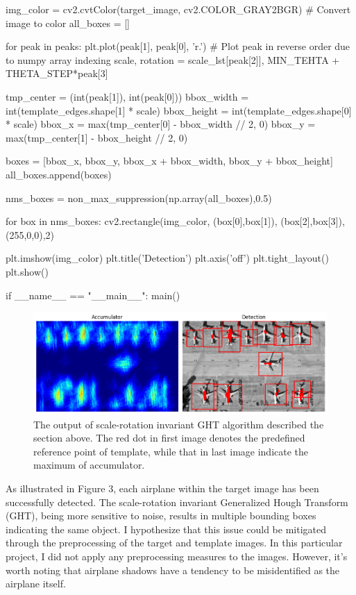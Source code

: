 \documentclass[10pt]{article}
\begin{document}
\begin{python}
    img_color = cv2.cvtColor(target_image, cv2.COLOR_GRAY2BGR)  # Convert image to color
    all_boxes = []

    for peak in peaks:
        plt.plot(peak[1], peak[0], 'r.')  # Plot peak in reverse order due to numpy array indexing
        scale, rotation = scale_lst[peak[2]], MIN_TEHTA + THETA_STEP*peak[3]

        tmp_center = (int(peak[1]), int(peak[0]))
        bbox_width = int(template_edges.shape[1] * scale)
        bbox_height = int(template_edges.shape[0] * scale)
        bbox_x = max(tmp_center[0] - bbox_width // 2, 0)
        bbox_y = max(tmp_center[1] - bbox_height // 2, 0)

        boxes = [bbox_x, bbox_y, bbox_x + bbox_width, bbox_y + bbox_height]
        all_boxes.append(boxes)
        
    nms_boxes = non_max_suppression(np.array(all_boxes),0.5)

    for box in nms_boxes:
        cv2.rectangle(img_color, (box[0],box[1]), (box[2],box[3]), (255,0,0),2)
        
    plt.imshow(img_color)
    plt.title('Detection')
    plt.axis('off')
    plt.tight_layout()
    plt.show()

if __name__ == "__main__":
    main()
\end{python}
\begin{figure}[!h]
    \begin{center}
        \includegraphics*[scale = 0.5]{../hw2/fig3.png}
    \end{center}
    \caption{The output of scale-rotation invariant GHT algorithm described the section above. The red dot in first image denotes the predefined reference point of template, while that in last image indicate the maximum of accumulator. }
\end{figure}
As illustrated in Figure 3, each airplane within the target image has been successfully detected. The scale-rotation invariant Generalized Hough Transform (GHT), being more sensitive to noise, results in multiple bounding boxes indicating the same object. I hypothesize that this issue could be mitigated through the preprocessing of the target and template images. In this particular project, I did not apply any preprocessing measures to the images. However, it's worth noting that airplane shadows have a tendency to be misidentified as the airplane itself. 
\end{document}
